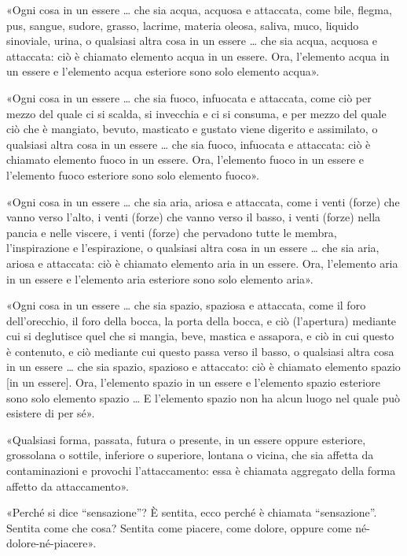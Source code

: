 «Ogni cosa in un essere … che sia acqua, acquosa e attaccata, come bile, flegma,
pus, sangue, sudore, grasso, lacrime, materia oleosa, saliva, muco, liquido
sinoviale, urina, o qualsiasi altra cosa in un essere … che sia acqua, acquosa e
attaccata: ciò è chiamato elemento acqua in un essere. Ora, l’elemento acqua in
un essere e l’elemento acqua esteriore sono solo elemento acqua».

«Ogni cosa in un essere … che sia fuoco, infuocata e attaccata, come ciò per
mezzo del quale ci si scalda, si invecchia e ci si consuma, e per mezzo del
quale ciò che è mangiato, bevuto, masticato e gustato viene digerito e
assimilato, o qualsiasi altra cosa in un essere … che sia fuoco, infuocata e
attaccata: ciò è chiamato elemento fuoco in un essere. Ora, l’elemento fuoco in
un essere e l’elemento fuoco esteriore sono solo elemento fuoco».

«Ogni cosa in un essere … che sia aria, ariosa e attaccata, come i venti (forze)
che vanno verso l’alto, i venti (forze) che vanno verso il basso, i venti
(forze) nella pancia e nelle viscere, i venti (forze) che pervadono tutte le
membra, l’inspirazione e l’espirazione, o qualsiasi altra cosa in un essere …
che sia aria, ariosa e attaccata: ciò è chiamato elemento aria in un essere.
Ora, l’elemento aria in un essere e l’elemento aria esteriore sono solo elemento
aria».

«Ogni cosa in un essere … che sia spazio, spaziosa e attaccata, come il foro
dell’orecchio, il foro della bocca, la porta della bocca, e ciò (l’apertura)
mediante cui si deglutisce quel che si mangia, beve, mastica e assapora, e ciò
in cui questo è contenuto, e ciò mediante cui questo passa verso il basso, o
qualsiasi altra cosa in un essere … che sia spazio, spazioso e attaccato: ciò è
chiamato elemento spazio [in un essere]. Ora, l’elemento spazio in un essere e
l’elemento spazio esteriore sono solo elemento spazio … E l’elemento spazio non
ha alcun luogo nel quale può esistere di per sé».


«Qualsiasi forma, passata, futura o presente, in un essere oppure esteriore,
grossolana o sottile, inferiore o superiore, lontana o vicina, che sia affetta
da contaminazioni e provochi l’attaccamento: essa è chiamata aggregato della
forma affetto da attaccamento».


«Perché si dice “sensazione”? È sentita, ecco perché è chiamata “sensazione”.
Sentita come che cosa? Sentita come piacere, come dolore, oppure come
né-dolore-né-piacere».

